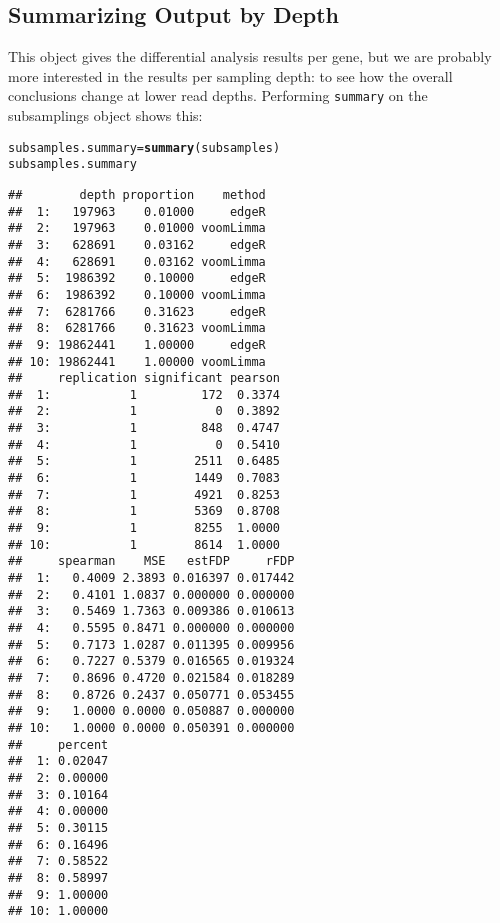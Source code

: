 \documentclass{article}\usepackage[]{graphicx}\usepackage[]{color}
\makeatletter
\newcommand{\hlstd}[1]{\textcolor[rgb]{0.345,0.345,0.345}{#1}}%
\newcommand{\hlkwb}[1]{\textcolor[rgb]{0.69,0.353,0.396}{#1}}%
\newcommand{\hlkwd}[1]{\textcolor[rgb]{0.737,0.353,0.396}{\textbf{#1}}}%
\newenvironment{kframe}{%
 \def\at@end@of@kframe{}%
 \ifinner\ifhmode%
  \def\at@end@of@kframe{\end{minipage}}%
  \begin{minipage}{\columnwidth}%
 \fi\fi%
 \def\FrameCommand##1{\hskip\@totalleftmargin \hskip-\fboxsep
 \colorbox{shadecolor}{##1}\hskip-\fboxsep
     \hskip-\linewidth \hskip-\@totalleftmargin \hskip\columnwidth}%
 \MakeFramed {\advance\hsize-\width
   \@totalleftmargin\z@ \linewidth\hsize
   \@setminipage}}%
 {\par\unskip\endMakeFramed%
 \at@end@of@kframe}
\newenvironment{knitrout}{}{} %
\makeatother
\begin{document}
\subsection{Summarizing Output by Depth}

This object gives the differential analysis results per gene, but we are probably more interested in the results per sampling depth: to see how the overall conclusions change at lower read depths. Performing \texttt{summary} on the subsamplings object shows this:

\begin{knitrout}
\color{fgcolor}\begin{kframe}
\begin{alltt}
\hlstd{subsamples.summary} \hlkwb{=} \hlkwd{summary}\hlstd{(subsamples)}
\hlstd{subsamples.summary}
\end{alltt}
\begin{verbatim}
##        depth proportion    method
##  1:   197963    0.01000     edgeR
##  2:   197963    0.01000 voomLimma
##  3:   628691    0.03162     edgeR
##  4:   628691    0.03162 voomLimma
##  5:  1986392    0.10000     edgeR
##  6:  1986392    0.10000 voomLimma
##  7:  6281766    0.31623     edgeR
##  8:  6281766    0.31623 voomLimma
##  9: 19862441    1.00000     edgeR
## 10: 19862441    1.00000 voomLimma
##     replication significant pearson
##  1:           1         172  0.3374
##  2:           1           0  0.3892
##  3:           1         848  0.4747
##  4:           1           0  0.5410
##  5:           1        2511  0.6485
##  6:           1        1449  0.7083
##  7:           1        4921  0.8253
##  8:           1        5369  0.8708
##  9:           1        8255  1.0000
## 10:           1        8614  1.0000
##     spearman    MSE   estFDP     rFDP
##  1:   0.4009 2.3893 0.016397 0.017442
##  2:   0.4101 1.0837 0.000000 0.000000
##  3:   0.5469 1.7363 0.009386 0.010613
##  4:   0.5595 0.8471 0.000000 0.000000
##  5:   0.7173 1.0287 0.011395 0.009956
##  6:   0.7227 0.5379 0.016565 0.019324
##  7:   0.8696 0.4720 0.021584 0.018289
##  8:   0.8726 0.2437 0.050771 0.053455
##  9:   1.0000 0.0000 0.050887 0.000000
## 10:   1.0000 0.0000 0.050391 0.000000
##     percent
##  1: 0.02047
##  2: 0.00000
##  3: 0.10164
##  4: 0.00000
##  5: 0.30115
##  6: 0.16496
##  7: 0.58522
##  8: 0.58997
##  9: 1.00000
## 10: 1.00000
\end{verbatim}
\end{kframe}
\end{knitrout}
\end{document}
